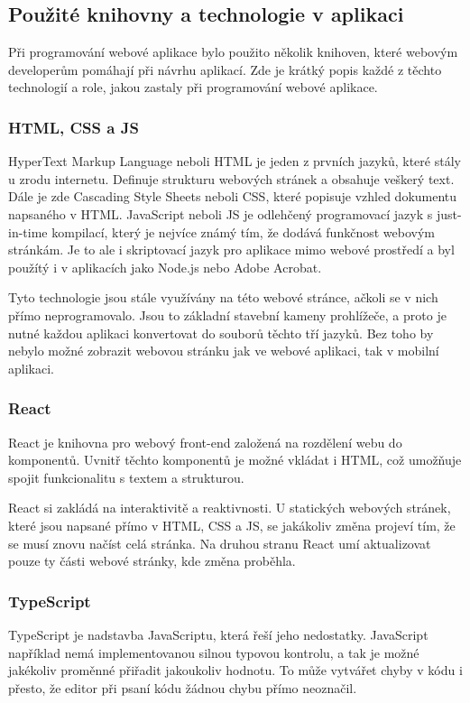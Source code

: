 \subsection{Použité knihovny a technologie v aplikaci}
Při programování webové aplikace bylo použito několik knihoven, které webovým developerům pomáhají při návrhu aplikací. Zde je krátký popis každé z těchto technologií a role, jakou zastaly při programování webové aplikace.

\subsubsection{HTML, CSS a JS}
HyperText Markup Language neboli HTML je jeden z prvních jazyků, které stály u zrodu internetu. Definuje strukturu webových stránek a obsahuje veškerý text. Dále je zde Cascading Style Sheets neboli CSS, které popisuje vzhled dokumentu napsaného v HTML. JavaScript neboli JS je odlehčený programovací jazyk s just-in-time kompilací, který je nejvíce známý tím, že dodává funkčnost webovým stránkám. Je to ale i skriptovací jazyk pro aplikace mimo webové prostředí a byl použítý i v aplikacích jako Node.js nebo Adobe Acrobat.
\cite{HTMLweb, CSSweb, JSweb}

Tyto technologie jsou stále využívány na této webové stránce, ačkoli se v nich přímo neprogramovalo. Jsou to základní stavební kameny prohlížeče, a proto je nutné každou aplikaci konvertovat do souborů těchto tří jazyků. Bez toho by nebylo možné zobrazit webovou stránku jak ve webové aplikaci, tak v mobilní aplikaci.

\subsubsection{React}\label{sec:React}
React je knihovna pro webový front-end založená na rozdělení webu do komponentů. Uvnitř těchto komponentů je možné vkládat i HTML, což umožňuje spojit funkcionalitu s textem a strukturou.

React si zakládá na interaktivitě a reaktivnosti. U statických webových stránek, které jsou napsané přímo v HTML, CSS a JS, se jakákoliv změna projeví tím, že se musí znovu načíst celá stránka. Na druhou stranu React umí aktualizovat pouze ty části webové stránky, kde změna proběhla.
\cite{ReactWeb}

\subsubsection{TypeScript}
TypeScript je nadstavba JavaScriptu, která řeší jeho nedostatky. JavaScript například nemá implementovanou silnou typovou kontrolu, a tak je možné jakékoliv proměnné přiřadit jakoukoliv hodnotu. To může vytvářet chyby v kódu i přesto, že editor při psaní kódu žádnou chybu přímo neoznačil.

